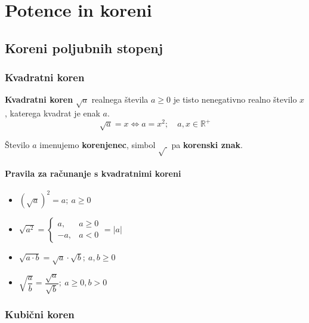 \chapter{Potence in koreni}




    \section{Koreni poljubnih stopenj}

        
            \subsection{Kvadratni koren}

                \textbf{Kvadratni koren} $\sqrt{a}$ realnega števila $a\geq 0$ je tisto nenegativno realno število $x$,
                katerega kvadrat je enak $a$.
                $$\sqrt{a}=x \Leftrightarrow a=x^2; \quad a,x\in\mathbb{R}^+ $$

                Število $a$ imenujemo \textbf{korenjenec}, simbol $\sqrt{~}$ pa \textbf{korenski znak}.
            

            \subsubsection*{Pravila za računanje s kvadratnimi koreni}
                    
                        \begin{itemize}
                            \item $\left(\sqrt{a}\right)^2=a; ~a\geq 0$
                            \item $\sqrt{a^2}=\begin{cases}
                                a, & a\geq 0 \\
                                -a, & a<0
                            \end{cases}=\lvert a\rvert$
                            \item $\sqrt{a\cdot b}=\sqrt{a}\cdot\sqrt{b}; ~a,b\geq 0$
                            \item $\sqrt{\dfrac{a}{b}}=\dfrac{\sqrt{a}}{\sqrt{b}}; ~a\geq 0, b>0$
                        \end{itemize}
                    
            

        

        
            \subsection{Kubični koren}

